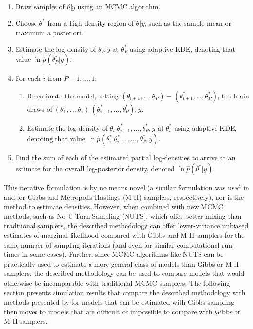 \documentclass[twocolumn]{article}
\begin{document}
\begin{enumerate}[noitemsep]
	\item Draw samples of $\theta|y$ using an MCMC algorithm.
	\item Choose $\theta^*$ from a high-density region of $\theta|y$, such as the sample mean or maximum a posteriori.
	\item Estimate the log-density of $\theta_P|y$ at $\theta_P^*$ using adaptive KDE, denoting that value $\ln \hat{p}(\theta_P^*|y)$.
	\item For each $i$ from $P-1, ..., 1$:
		\begin{enumerate}
			\item Re-estimate the model, setting $(\theta_{i+1}, ..., \theta_P) = (\theta_{i+1}^*, ..., \theta_P^*)$, to obtain draws of $(\theta_1, ..., \theta_i)|(\theta_{i+1}^*, ..., \theta_P^*), y$.
			\item Estimate the log-density of $\theta_i|\theta_{i+1}^*, ..., \theta_P^*, y$ at $\theta_i^*$ using adaptive KDE, denoting that value $\ln \hat{p}(\theta_i^*|\theta_{i+1}^*, ..., \theta_P^*, y)$.
		\end{enumerate}
	\item Find the sum of each of the estimated partial log-densities to arrive at an estimate for the overall log-posterior density, denoted $\ln \hat{p}(\theta^*|y)$.
\end{enumerate}

This iterative formulation is by no means novel (a similar formulation was used in \cite{Chib} and \cite{ChibJeliazkov} for Gibbs and Metropolis-Hastings (M-H) samplers, respectively), nor is the method to estimate densities. However, when combined with new MCMC methods, such as No U-Turn Sampling (NUTS), which offer better mixing than  traditional samplers, the described methodology can offer lower-variance unbiased estimates of marginal likelihood compared with Gibbs and M-H samplers for the same number of sampling iterations (and even for similar computational run-times in some cases). Further, since MCMC algorithms like NUTS can be practically used to estimate a more general class of models than Gibbs or M-H samplers, the described methodology can be used to compare models that would otherwise be incomparable with traditional MCMC samplers. The following section presents simulation results that compare the described methodology with methods presented by \cite{Chib} for models that can be estimated with Gibbs sampling, then moves to models that are difficult or impossible to compare with Gibbs or M-H samplers.
\end{document}
